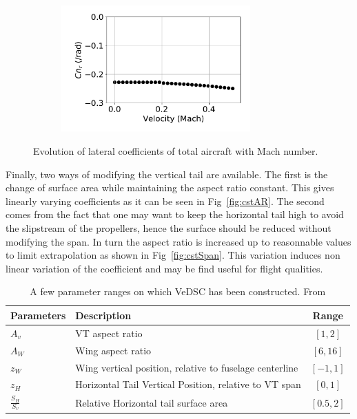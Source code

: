 \begin{figure}[hbt]
\begin{subfigure}[b]{0.49\textwidth}
		\caption{}
		\label{fig:CnbetaMachChange}
	\end{subfigure}
	\begin{subfigure}[b]{0.49\textwidth}
		\includegraphics[width=0.8\textwidth]{CnrMachChange}
		\caption{}
		\label{fig:CnrMachChange}
	\end{subfigure}
	\caption{Evolution of lateral coefficients of total aircraft with Mach number.}\label{fig:MachVariation}
\end{figure}

Finally, two ways of modifying the vertical tail are available. The first is the change of surface area while maintaining the aspect ratio constant. This gives linearly varying coefficients as it can be seen in Fig~\ref{fig:cstAR}. The second comes from the fact that one may want to keep the horizontal tail high to avoid the slipstream of the propellers, hence the surface should be reduced without modifying the span. In turn the aspect ratio is increased up to reasonnable values to limit extrapolation as shown in Fig~\ref{fig:cstSpan}. This variation induces non linear variation of the coefficient and may be find useful for flight qualities.

\begin{table}[hbt]
	\caption{\label{tab:VeDSCParam} A few parameter ranges on which VeDSC has been constructed. From \cite{NicolosiNewApproach}} 
	\centering
	\begin{tabular}{l|l|c}
		Parameters & Description & Range\\
		\hline
		$A_v$ & VT aspect ratio & $\left[1,2\right]$\\
		$A_W$ & Wing aspect ratio & $\left[6,16\right]$\\
		$z_W$ & Wing vertical position, relative to fuselage centerline & $\left[-1,1\right]$ \\
		$z_H$ & Horizontal Tail Vertical Position, relative to VT span & $\left[0,1\right]$\\
		$\frac{S_H}{S_v}$ & Relative Horizontal tail surface area & $\left[0.5,2\right]$
	\end{tabular}
\end{table}
